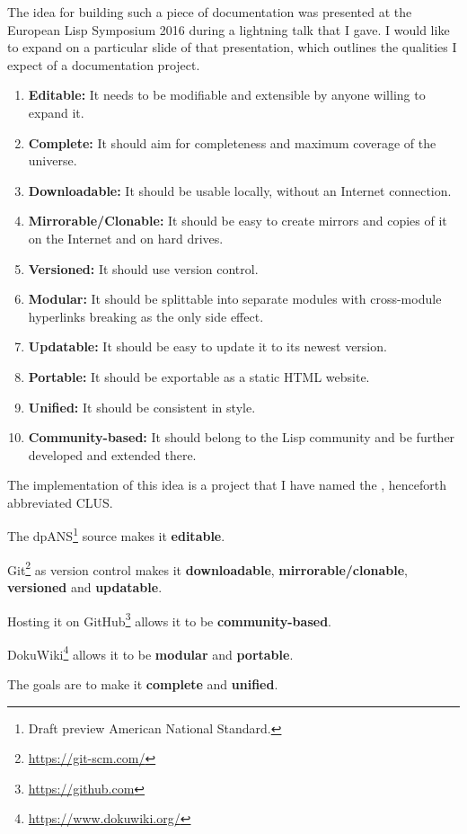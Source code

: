 The idea for building such a piece of documentation was presented at the European Lisp Symposium 2016 during a lightning talk\cite{els:2016:clus} that I gave. I would like to expand on a particular slide of that presentation, which outlines the qualities I expect of a \cl{} documentation project.
\begin{enumerate}
\item \textbf{Editable:}
It needs to be modifiable and extensible by anyone willing to expand it.
\item \textbf{Complete:}
It should aim for completeness and maximum coverage of the \cl{} universe.
\item \textbf{Downloadable:}
It should be usable locally, without an Internet connection.
\item \textbf{Mirrorable/Clonable:}
It should be easy to create mirrors and copies of it on the Internet and on hard drives.
\item \textbf{Versioned:}
It should use version control.
\item \textbf{Modular:}
It should be splittable into separate modules with cross-module hyperlinks breaking as the only side effect.
\item \textbf{Updatable:}
It should be easy to update it to its newest version.
\item \textbf{Portable:}
It should be exportable as a static HTML website.
\item \textbf{Unified:}
It should be consistent in style.
\item \textbf{Community-based:}
It should belong to the Lisp community and be further developed and extended there.
\end{enumerate}

The implementation of this idea is a project that I have named the \cl{} \us{}, henceforth abbreviated CLUS.

The dpANS\footnote{Draft preview American National Standard.} source\cite{ANSI:1994:draft} makes it \textbf{editable}.

Git\footnote{\url{https://git-scm.com/}} as version control makes it \textbf{downloadable}, \textbf{mirrorable/clonable}, \textbf{versioned} and \textbf{updatable}.

Hosting it on GitHub\footnote{\url{https://github.com}} allows it to be \textbf{community-based}.

DokuWiki\footnote{\url{https://www.dokuwiki.org/}} allows it to be \textbf{modular} and \textbf{portable}.

The goals are to make it \textbf{complete} and \textbf{unified}.

